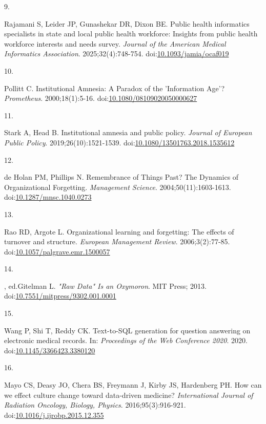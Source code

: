 \documentclass[
  american,
  11pt,
  letterpaper,
  oneside  ,captions=tableheading
]{scrartcl}
\newlength{\cslhangindent}
\newlength{\csllabelwidth}
\newenvironment{CSLReferences}[2] %
 {\begin{list}{}{%
  \setlength{\itemindent}{0pt}
  \setlength{\leftmargin}{0pt}
  \setlength{\parsep}{0pt}
  \ifodd #1
   \setlength{\leftmargin}{\cslhangindent}
   \setlength{\itemindent}{-1\cslhangindent}
  \fi
  \setlength{\itemsep}{#2\baselineskip}}}
 {\end{list}}
\newcommand{\CSLLeftMargin}[1]{\parbox[t]{\csllabelwidth}{\strut#1\strut}}
\newcommand{\CSLRightInline}[1]{\parbox[t]{\linewidth - \csllabelwidth}{\strut#1\strut}}
\begin{document}
\begin{CSLReferences}{0}{1}
\CSLLeftMargin{9. }%
\CSLRightInline{Rajamani S, Leider JP, Gunashekar DR, Dixon BE. {Public
health informatics specialists in state and local public health
workforce: Insights from public health workforce interests and needs
survey}. \emph{Journal of the American Medical Informatics Association}.
2025;32(4):748-754.
doi:\href{https://doi.org/10.1093/jamia/ocaf019}{10.1093/jamia/ocaf019}}

\CSLLeftMargin{10. }%
\CSLRightInline{Pollitt C. {Institutional Amnesia: A Paradox of the
'Information Age'?} \emph{Prometheus}. 2000;18(1):5-16.
doi:\href{https://doi.org/10.1080/08109020050000627}{10.1080/08109020050000627}}

\CSLLeftMargin{11. }%
\CSLRightInline{Stark A, Head B. {Institutional amnesia and public
policy}. \emph{Journal of European Public Policy}.
2019;26(10):1521-1539.
doi:\href{https://doi.org/10.1080/13501763.2018.1535612}{10.1080/13501763.2018.1535612}}

\CSLLeftMargin{12. }%
\CSLRightInline{{de Holan PM, Phillips N}. {Remembrance of Things Past?
The Dynamics of Organizational Forgetting}. \emph{Management Science}.
2004;50(11):1603-1613.
doi:\href{https://doi.org/10.1287/mnsc.1040.0273}{10.1287/mnsc.1040.0273}}

\CSLLeftMargin{13. }%
\CSLRightInline{Rao RD, Argote L. Organizational learning and
forgetting: The effects of turnover and structure. \emph{European
Management Review}. 2006;3(2):77-85.
doi:\href{https://doi.org/10.1057/palgrave.emr.1500057}{10.1057/palgrave.emr.1500057}}

\CSLLeftMargin{14. }%
\CSLRightInline{, ed.Gitelman L. \emph{{"Raw Data" Is an Oxymoron}}. MIT
Press; 2013.
doi:\href{https://doi.org/10.7551/mitpress/9302.001.0001}{10.7551/mitpress/9302.001.0001}}

\CSLLeftMargin{15. }%
\CSLRightInline{Wang P, Shi T, Reddy CK. {Text-to-SQL generation for
question answering on electronic medical records}. In: \emph{Proceedings
of the Web Conference 2020}. 2020.
doi:\href{https://doi.org/10.1145/3366423.3380120}{10.1145/3366423.3380120}}

\CSLLeftMargin{16. }%
\CSLRightInline{Mayo CS, Deasy JO, Chera BS, Freymann J, Kirby JS,
Hardenberg PH. {How can we effect culture change toward data-driven
medicine?} \emph{International Journal of Radiation Oncology, Biology,
Physics}. 2016;95(3):916-921.
doi:\href{https://doi.org/10.1016/j.ijrobp.2015.12.355}{10.1016/j.ijrobp.2015.12.355}}


\end{CSLReferences}
\end{document}

